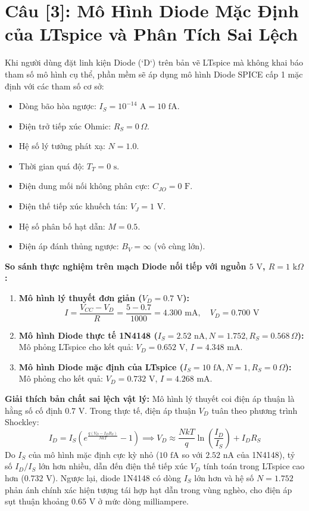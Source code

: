 \documentclass[12pt,a4paper]{report}
\begin{document}
\section*{Câu [3]: Mô Hình Diode Mặc Định của LTspice và Phân Tích Sai Lệch}

Khi người dùng đặt linh kiện Diode (`D`) trên bản vẽ LTspice mà không khai báo tham số mô hình cụ thể, phần mềm sẽ áp dụng mô hình Diode SPICE cấp 1 mặc định với các tham số cơ sở:
\begin{itemize}[noitemsep]
    \item Dòng bão hòa ngược: $I_S = 10^{-14}\text{ A} = 10\text{ fA}$.
    \item Điện trở tiếp xúc Ohmic: $R_S = 0\,\Omega$.
    \item Hệ số lý tưởng phát xạ: $N = 1.0$.
    \item Thời gian quá độ: $T_T = 0\text{ s}$.
    \item Điện dung mối nối không phân cực: $C_{JO} = 0\text{ F}$.
    \item Điện thế tiếp xúc khuếch tán: $V_J = 1\text{ V}$.
    \item Hệ số phân bố hạt dẫn: $M = 0.5$.
    \item Điện áp đánh thủng ngược: $B_V = \infty$ (vô cùng lớn).
\end{itemize}

\textbf{So sánh thực nghiệm trên mạch Diode nối tiếp với nguồn $5\text{ V}$, $R = 1\text{ k}\Omega$:}
\begin{enumerate}
    \item \textbf{Mô hình lý thuyết đơn giản ($V_D = 0.7\text{ V}$):}
    $$I = \frac{V_{CC} - V_D}{R} = \frac{5 - 0.7}{1000} = 4.300\text{ mA}, \quad V_D = 0.700\text{ V}$$
    \item \textbf{Mô hình Diode thực tế 1N4148 ($I_S = 2.52\text{ nA}, N = 1.752, R_S = 0.568\,\Omega$):}
    Mô phỏng LTspice cho kết quả: $V_D = 0.652\text{ V}$, $I = 4.348\text{ mA}$.
    \item \textbf{Mô hình Diode mặc định của LTspice ($I_S = 10\text{ fA}, N = 1, R_S = 0\,\Omega$):}
    Mô phỏng cho kết quả: $V_D = 0.732\text{ V}$, $I = 4.268\text{ mA}$.
\end{enumerate}

\textbf{Giải thích bản chất sai lệch vật lý:}
Mô hình lý thuyết coi điện áp thuận là hằng số cố định $0.7\text{ V}$. Trong thực tế, điện áp thuận $V_D$ tuân theo phương trình Shockley:
\begin{equation}
    I_D = I_S \left( e^{\frac{q(V_D - I_D R_S)}{N k T}} - 1 \right) \implies V_D \approx \frac{N k T}{q} \ln\left(\frac{I_D}{I_S}\right) + I_D R_S
\end{equation}
Do $I_S$ của mô hình mặc định cực kỳ nhỏ ($10\text{ fA}$ so với $2.52\text{ nA}$ của 1N4148), tỷ số $I_D/I_S$ lớn hơn nhiều, dẫn đến điện thế tiếp xúc $V_D$ tính toán trong LTspice cao hơn ($0.732\text{ V}$). Ngược lại, diode 1N4148 có dòng $I_S$ lớn hơn và hệ số $N=1.752$ phản ánh chính xác hiện tượng tái hợp hạt dẫn trong vùng nghèo, cho điện áp sụt thuận khoảng $0.65\text{ V}$ ở mức dòng milliampere.
\end{document}
